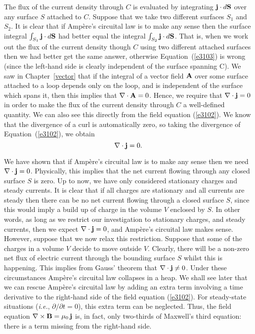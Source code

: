 The flux of the current density
through $C$ is evaluated by integrating ${\bf j}\cdot d{\bf S}$ over any surface
$S$ attached to $C$. Suppose that we take  two different surfaces $S_1$ and
$S_2$. It is clear that if Amp\`{e}re's circuital
law is to make any sense then the surface integral $\int_{S_1} {\bf j}
\cdot d{\bf S} $ had better equal the integral $\int_{S_2} {\bf j}
\cdot d{\bf S} $. That is, when we work out the flux of the current density
though $C$ using two different attached surfaces then we had better get
the same answer, otherwise Equation~(\ref{e3103}) is wrong (since the left-hand side is clearly independent
of the surface spanning C). 
We saw in Chapter~\ref{vector} that if the  integral of a vector field ${\bf A}$
over some surface attached to a loop depends only on the loop, and is 
independent of the surface which spans it, then this implies that
$\nabla\cdot {\bf A} = 0$. Hence,
we require that $\nabla\cdot{\bf j} = 0$ in order to make the
flux of the current density through $C$ a well-defined quantity. We can also see this directly from the field equation (\ref{e3102}). We know that
the divergence of a curl is automatically zero, so taking the divergence 
of Equation~(\ref{e3102}), we obtain
\begin{equation}
\nabla\cdot{\bf j} = 0.
\end{equation}

We have shown that if Amp\`{e}re's circuital law is to make any sense then we need
$\nabla\cdot{\bf j} = 0$. Physically, this implies that the net current flowing
through any closed surface $S$ is zero. 
Up to now, we have only considered
stationary charges and steady currents. It is clear that if all charges are
stationary and all currents are steady then there can be no net current flowing
through a closed surface $S$, since this would imply a build up of charge in the
volume $V$ enclosed by $S$. In other words, as long as we restrict our investigation
to stationary charges, and steady currents, then we expect $\nabla\cdot {\bf j}=0$,
and Amp\`{e}re's circuital law makes sense. However, suppose that we now relax this
restriction. Suppose that some of the charges in a volume $V$ decide to move
outside $V$. Clearly, there will be a non-zero net flux of electric current through
the bounding surface $S$ whilst this is happening. This implies from
Gauss' theorem that $\nabla\cdot{\bf j} \neq 0$. Under these circumstances
Amp\`{e}re's circuital law collapses in  a heap. We shall see later that we can rescue
Amp\`{e}re's  circuital law by adding an extra term involving a time derivative to the
right-hand side of the field equation (\ref{e3102}).
 For steady-state situations ({\em i.e.}, $\partial/\partial t=0$), this
extra term can be neglected. Thus, the field equation 
$\nabla\times{\bf B} = \mu_0 \,{\bf j}$
is, in fact, only two-thirds of Maxwell's third equation: there is a term missing
from the right-hand side. 

